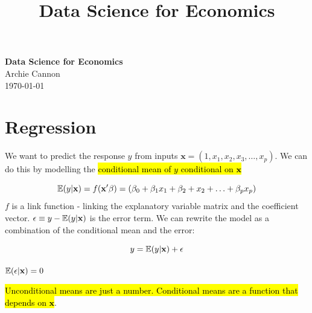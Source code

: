 \documentclass[11pt]{article}
\begin{document}
\title{Data Science for Economics}

\thispagestyle{empty}

\begin{center}
{\LARGE \bf Data Science for Economics}\\
{\large Archie Cannon}\\
\today
\end{center}
\hypertarget{contents}{}
{
\begin{tcolorbox}[title=Contents, fonttitle=\huge\sffamily\bfseries\selectfont,interior style={left color=contcol1!50!white,right color=contcol2!50!white},frame style={left color=contcol1!80!white,right color=contcol2!80!white},coltitle=black,top=2mm,bottom=2mm,left=2mm,right=2mm,drop fuzzy shadow,enhanced,breakable]
\makeatletter
{}
\makeatother
\end{tcolorbox}}


\newpage

\section{Regression}

We want to predict the response $y$ from inputs $\mathbf{x} = (1, x_1, x_2, x_3, \ldots, x_p)$. We can do this by modelling the \hl{conditional mean of $y$ conditional on $\mathbf{x}$}

\begin{equation*}
    \mathbb{E}(y|\mathbf{x}) = f(\mathbf{x^\prime\beta}) = (\beta_0 + \beta_1 x_1 + \beta_2 + x_2 + \ldots + \beta_p x_p)
\end{equation*}
$f$ is a link function - linking the explanatory variable matrix and the coefficient vector. $\epsilon \equiv y - \mathbb{E}(y|\mathbf{x})$ is the error term. We can rewrite the model as a combination of the conditional mean and the error:

\begin{equation}
    y = \mathbb{E}(y|\mathbf{x}) + \epsilon
\end{equation}

\begin{note}
    $\mathbb{E}(\epsilon|\mathbf{x}) = 0$
\end{note}

\begin{note}
    \hl{Unconditional means are just a number. Conditional means are a function that depends on $\mathbf{x}$}.
\end{note}
\end{document}
